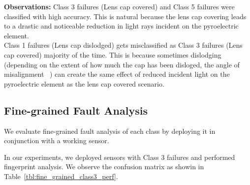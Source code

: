 \noindent \textbf{Observations:} \ci Class 3 failures (Lens cap covered) and Class 5 failures were classified with high accuracy. This is natural because the lens cap covering leads to a drastic and noticeable reduction in light rays incident on the pyroelectric element. \\
\cii Class 1 failures (Lens cap dislodged) gets misclassified as Class 3 failures (Lens cap covered) majority of the time. This is because sometimes dislodging (depending on the extent of how much the cap has been disloged, the angle of misalignment ~\etc) can create the same effect of reduced incident light on the pyroelectric element as the lens cap covered scenario.






\subsection{Fine-grained Fault Analysis} We evaluate fine-grained fault analysis of each class by deploying it in conjunction with a working sensor. 

In our experiments, we deployed sensors with Class 3 failures and performed fingerprint analysis. We observe the confusion matrix as showin in Table~\ref{tbl:fine_grained_class3_perf}.

